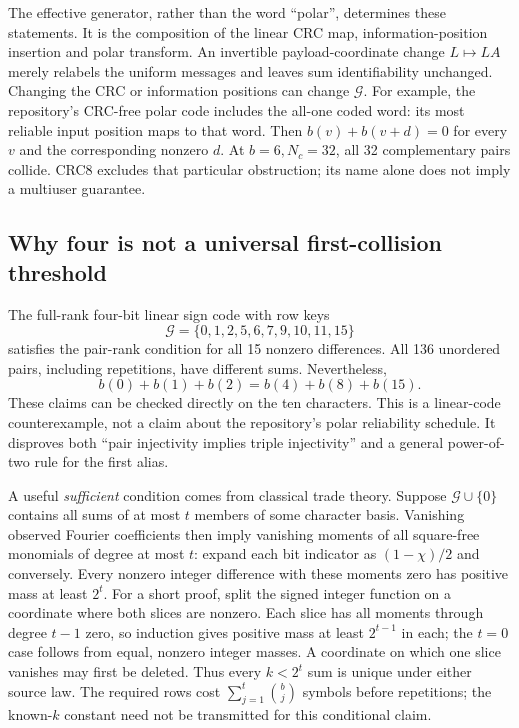 \documentclass[10pt,a4paper]{article}
\begin{document}
The effective generator, rather than the word ``polar'', determines these statements. It is the
composition of the linear CRC map, information-position insertion and polar transform. An invertible
payload-coordinate change $L\mapsto LA$ merely relabels the uniform messages and leaves sum
identifiability unchanged. Changing the CRC or information positions can change $\mathcal G$.
For example, the repository's CRC-free polar code includes the all-one coded word: its most reliable
input position maps to that word. Then $b(v)+b(v+d)=0$ for every $v$ and the corresponding nonzero $d$.
At $b=6,N_c=32$, all 32 complementary pairs collide. CRC8 excludes that particular obstruction;
its name alone does not imply a multiuser guarantee.

\subsection{Why four is not a universal first-collision threshold}
The full-rank four-bit linear sign code with row keys
\[
 \mathcal G=\{0,1,2,5,6,7,9,10,11,15\}
\]
satisfies the pair-rank condition for all 15 nonzero differences. All 136 unordered pairs,
including repetitions, have different sums. Nevertheless,
\[
 b(0)+b(1)+b(2)=b(4)+b(8)+b(15).
\]
These claims can be checked directly on the ten characters. This is a linear-code counterexample,
not a claim about the repository's polar reliability schedule. It disproves both ``pair injectivity
implies triple injectivity'' and a general power-of-two rule for the first alias.

A useful \emph{sufficient} condition comes from classical trade theory\cite{trades}. Suppose
$\mathcal G\cup\{0\}$ contains all sums of at most $t$ members of some character basis.
Vanishing observed Fourier coefficients then imply vanishing moments of all square-free monomials
of degree at most $t$: expand each bit indicator as $(1-\chi)/2$ and conversely.
Every nonzero integer difference with these moments zero has positive mass at least $2^t$.
For a short proof, split the signed integer function on a coordinate where both slices are nonzero.
Each slice has all moments through degree $t-1$ zero, so induction gives positive mass at least
$2^{t-1}$ in each; the $t=0$ case follows from equal, nonzero integer masses. A coordinate on which
one slice vanishes may first be deleted. Thus every $k<2^t$ sum is unique under either source law.
The required rows cost $\sum_{j=1}^t\binom bj$ symbols before repetitions; the known-$k$ constant
need not be transmitted for this conditional claim.
\end{document}
